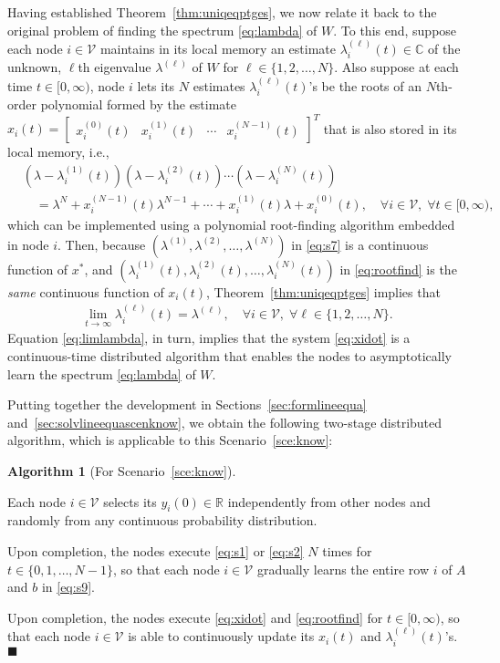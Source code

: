 \documentclass[11pt]{article}
\theoremstyle{plain}
\theoremstyle{definition}
\newtheorem{algorithm}{Algorithm}
\theoremstyle{remark}
\newenvironment{algorithmstep}{\ \begin{list}{\labelenumi}{\topsep0in\itemsep0in\parsep0in\labelwidth1in\usecounter{enumi}}}{\hfill$\blacksquare$\end{list}}
\begin{document}
Having established Theorem~\ref{thm:uniqeqptges}, we now relate it back to the original problem of finding the spectrum \eqref{eq:lambda} of $W$. To this end, suppose each node $i\in\mathcal{V}$ maintains in its local memory an estimate $\lambda_i^{(\ell)}(t)\in\mathbb{C}$ of the unknown, $\ell$th eigenvalue $\lambda^{(\ell)}$ of $W$ for $\ell\in\{1,2,\ldots,N\}$. Also suppose at each time $t\in[0,\infty)$, node $i$ lets its $N$ estimates $\lambda_i^{(\ell)}(t)$'s be the roots of an $N$th-order polynomial formed by the estimate $x_i(t)=\begin{bmatrix}x_i^{(0)}(t) & x_i^{(1)}(t) & \cdots & x_i^{(N-1)}(t)\end{bmatrix}^T$ that is also stored in its local memory, i.e.,
\begin{align}
&(\lambda-\lambda_i^{(1)}(t))(\lambda-\lambda_i^{(2)}(t))\cdots(\lambda-\lambda_i^{(N)}(t))\nonumber\\
&\quad=\lambda^N+x_i^{(N-1)}(t)\lambda^{N-1}+\cdots+x_i^{(1)}(t)\lambda+x_i^{(0)}(t),\quad\forall i\in\mathcal{V},\;\forall t\in[0,\infty),\label{eq:rootfind}
\end{align}
which can be implemented using a polynomial root-finding algorithm embedded in node $i$. Then, because $(\lambda^{(1)},\lambda^{(2)},\ldots,\lambda^{(N)})$ in \eqref{eq:s7} is a continuous function of $x^*$, and $(\lambda_i^{(1)}(t),\lambda_i^{(2)}(t),\ldots,\lambda_i^{(N)}(t))$ in \eqref{eq:rootfind} is the {\em same} continuous function of $x_i(t)$, Theorem~\ref{thm:uniqeqptges} implies that
\begin{align}
\lim_{t\rightarrow\infty}\lambda_i^{(\ell)}(t)=\lambda^{(\ell)},\quad\forall i\in\mathcal{V},\;\forall\ell\in\{1,2,\ldots,N\}.\label{eq:limlambda}
\end{align}
Equation \eqref{eq:limlambda}, in turn, implies that the system \eqref{eq:xidot} is a continuous-time distributed algorithm that enables the nodes to asymptotically learn the spectrum \eqref{eq:lambda} of $W$.

Putting together the development in Sections~\ref{sec:formlineequa} and~\ref{sec:solvlineequascenknow}, we obtain the following two-stage distributed algorithm, which is applicable to this Scenario~\ref{sce:know}:

\begin{algorithm}[For Scenario~\ref{sce:know}]\label{alg:know}
\begin{algorithmstep}
\item Each node $i\in\mathcal{V}$ selects its $y_i(0)\in\mathbb{R}$ independently from other nodes and randomly from any continuous probability distribution.
\item Upon completion, the nodes execute \eqref{eq:s1} or \eqref{eq:s2} $N$ times for $t\in\{0,1,\ldots,N-1\}$, so that each node $i\in\mathcal{V}$ gradually learns the entire row $i$ of $A$ and $b$ in \eqref{eq:s9}.
\item Upon completion, the nodes execute \eqref{eq:xidot} and \eqref{eq:rootfind} for $t\in[0,\infty)$, so that each node $i\in\mathcal{V}$ is able to continuously update its $x_i(t)$ and $\lambda_i^{(\ell)}(t)$'s.
\end{algorithmstep}
\end{algorithm}
\end{document}
